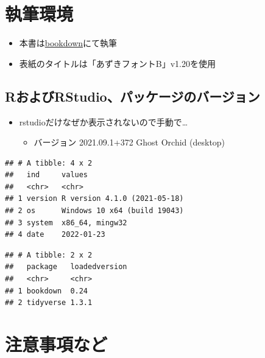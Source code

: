 \documentclass[
  xelatex,ja=standard, b5paper]{bxjsbook}
\providecommand{\tightlist}{%
  \setlength{\itemsep}{0pt}\setlength{\parskip}{0pt}}
\begin{document}
\hypertarget{ux57f7ux7b46ux74b0ux5883}{%
\section*{執筆環境}\label{ux57f7ux7b46ux74b0ux5883}}

\begin{itemize}
\tightlist
\item
  本書は\href{https://bookdown.org/}{bookdown}にて執筆
\item
  表紙のタイトルは「あずきフォントB」v1.20を使用
\end{itemize}

\hypertarget{rux304aux3088ux3073rstudioux30d1ux30c3ux30b1ux30fcux30b8ux306eux30d0ux30fcux30b8ux30e7ux30f3}{%
\subsection*{RおよびRStudio、パッケージのバージョン}\label{rux304aux3088ux3073rstudioux30d1ux30c3ux30b1ux30fcux30b8ux306eux30d0ux30fcux30b8ux30e7ux30f3}}

\begin{itemize}
\tightlist
\item
  rstudioだけなぜか表示されないので手動で\ldots{}

  \begin{itemize}
  \tightlist
  \item
    バージョン 2021.09.1+372 Ghost Orchid (desktop)
  \end{itemize}
\end{itemize}

\begin{verbatim}
## # A tibble: 4 x 2
##   ind     values                      
##   <chr>   <chr>                       
## 1 version R version 4.1.0 (2021-05-18)
## 2 os      Windows 10 x64 (build 19043)
## 3 system  x86_64, mingw32             
## 4 date    2022-01-23
\end{verbatim}

\begin{verbatim}
## # A tibble: 2 x 2
##   package   loadedversion
##   <chr>     <chr>        
## 1 bookdown  0.24         
## 2 tidyverse 1.3.1
\end{verbatim}

\hypertarget{ux6ce8ux610fux4e8bux9805ux306aux3069}{%
\section*{注意事項など}\label{ux6ce8ux610fux4e8bux9805ux306aux3069}}
\end{document}

